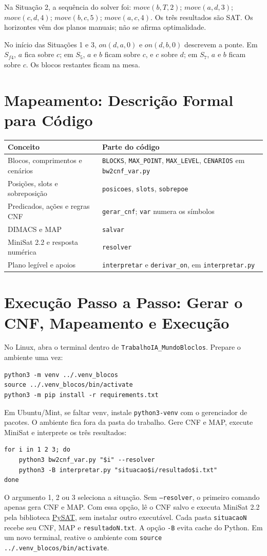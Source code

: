 \documentclass[11pt,a4paper]{article}
\newcommand{\code}[1]{\texttt{#1}}
\begin{document}
Na Situação 2, a sequência do solver foi: $move(b,T,2)$; $move(a,d,3)$; $move(c,d,4)$; $move(b,c,5)$; $move(a,c,4)$. Os três resultados são SAT. Os horizontes vêm dos planos manuais; não se afirma optimalidade.

No início das Situações 1 e 3, $on(d,a,0)$ e $on(d,b,0)$ descrevem a ponte. Em $S_{f4}$, $a$ fica sobre $c$; em $S_5$, $a$ e $b$ ficam sobre $c$, e $c$ sobre $d$; em $S_7$, $a$ e $b$ ficam sobre $c$. Os blocos restantes ficam na mesa.

\newpage
\section{Mapeamento: Descrição Formal para Código}
\begin{tabularx}{\linewidth}{L{5cm}Y}
\toprule Conceito & Parte do código \\ \midrule
Blocos, comprimentos e cenários & \code{BLOCKS}, \code{MAX\_POINT}, \code{MAX\_LEVEL}, \code{CENARIOS} em \code{bw2cnf\_var.py}\\
Posições, slots e sobreposição & \code{posicoes}, \code{slots}, \code{sobrepoe}\\
Predicados, ações e regras CNF & \code{gerar\_cnf}; \code{var} numera os símbolos\\
DIMACS e MAP & \code{salvar}\\
MiniSat 2.2 e resposta numérica & \code{resolver}\\
Plano legível e apoios & \code{interpretar} e \code{derivar\_on}, em \code{interpretar.py}\\ \bottomrule
\end{tabularx}

\section{Execução Passo a Passo: Gerar o CNF, Mapeamento e Execução}
No Linux, abra o terminal dentro de \code{TrabalhoIA\_MundoBloclos}. Prepare o ambiente uma vez:
\begin{lstlisting}
python3 -m venv ../.venv_blocos
source ../.venv_blocos/bin/activate
python3 -m pip install -r requirements.txt
\end{lstlisting}
Em Ubuntu/Mint, se faltar venv, instale \code{python3-venv} com o gerenciador de pacotes. O ambiente fica fora da pasta do trabalho. Gere CNF e MAP, execute MiniSat e interprete os três resultados:
\begin{lstlisting}
for i in 1 2 3; do
    python3 bw2cnf_var.py "$i" --resolver
    python3 -B interpretar.py "situacao$i/resultado$i.txt"
done
\end{lstlisting}
O argumento 1, 2 ou 3 seleciona a situação. Sem \code{--resolver}, o primeiro comando apenas gera CNF e MAP. Com essa opção, lê o CNF salvo e executa MiniSat 2.2 pela biblioteca \href{https://pysathq.github.io/docs/html/api/solvers.html}{PySAT}, sem instalar outro executável. Cada pasta \code{situacaoN} recebe seu CNF, MAP e \code{resultadoN.txt}. A opção \code{-B} evita cache do Python. Em um novo terminal, reative o ambiente com \code{source ../.venv\_blocos/bin/activate}.
\end{document}
